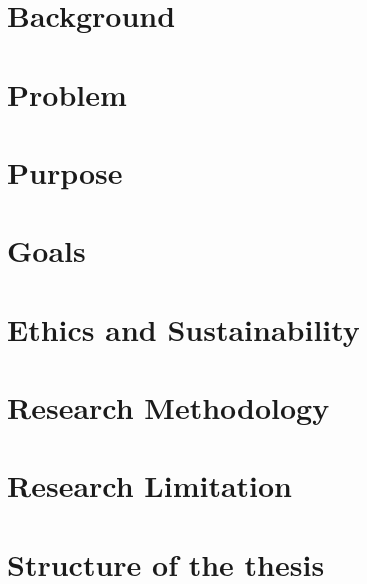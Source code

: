 

\section{Background}
    \label{sec:intro_background}
    

\section{Problem}
    \label{sec:intro_problem}
    

\section{Purpose}
    \label{sec:intro_purpose}
    

\section{Goals}
    \label{sec:intro_goals}
    

\section{Ethics and Sustainability}
    \label{sec:intro_ethics_and_sustainability}
    

\section{Research Methodology}
    \label{sec:intro_research_methodology}
    

\section{Research Limitation}
    \label{sec:intro_research_limitations}
    

\section{Structure of the thesis}
    \label{sec:intro_structure_thesis}
    